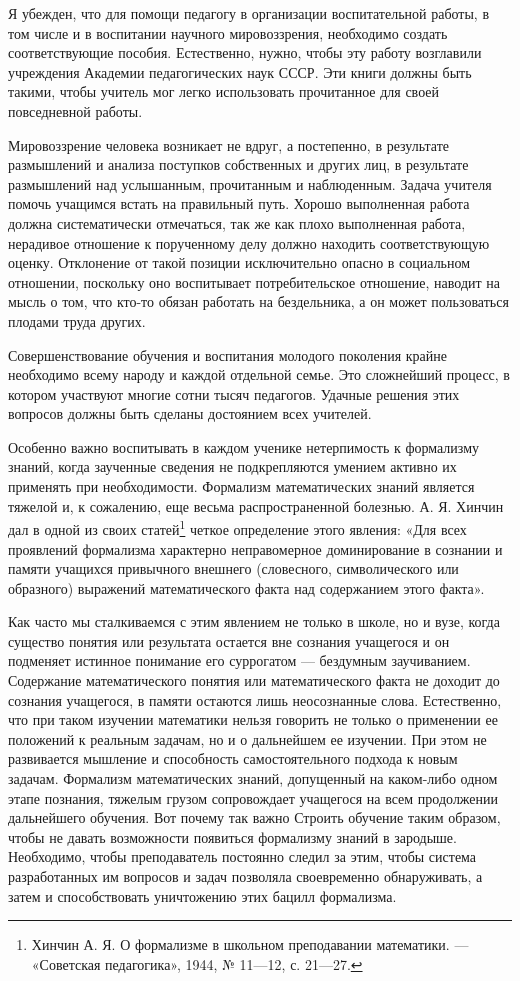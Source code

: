 \documentclass[12pt, a4paper, openany]{book}
\begin{document}
Я убежден, что для помощи педагогу в организации  воспитательной работы, в том числе и в воспитании научного мировоззрения, необходимо создать соответствующие  пособия. Естественно, нужно, чтобы эту работу возглавили учреждения Академии педагогических наук СССР. Эти  книги должны быть такими, чтобы учитель мог легко  использовать прочитанное для своей повседневной работы. 

Мировоззрение человека возникает не вдруг, а  постепенно, в результате размышлений и анализа поступков  собственных и других лиц, в результате размышлений над  услышанным, прочитанным и наблюденным. Задача учителя помочь учащимся встать на правильный путь. Хорошо выполненная работа должна систематически отмечаться, так же как плохо выполненная работа, нерадивое отношение к порученному делу должно находить соответствующую оценку. Отклонение от такой позиции исключительно  опасно в социальном отношении, поскольку оно воспитывает потребительское отношение, наводит на мысль о том, что кто-то обязан работать на бездельника, а он может  пользоваться плодами труда других. 

Совершенствование обучения и воспитания молодого поколения крайне необходимо всему народу и каждой  отдельной семье. Это сложнейший процесс, в котором  участвуют многие сотни тысяч педагогов. Удачные решения этих вопросов должны быть сделаны достоянием всех  учителей. 

Особенно важно воспитывать в каждом ученике  нетерпимость к формализму знаний, когда заученные сведения не подкрепляются умением активно их применять при  необходимости. Формализм математических знаний является тяжелой и, к сожалению, еще весьма распространенной болезнью. А. Я. Хинчин дал в одной из своих статей{\footnote{Хинчин А. Я. О формализме в школьном преподавании математики. — «Советская педагогика», 1944, № 11—12, с. 21—27.}} четкое определение этого явления: «Для всех проявлений формализма характерно неправомерное доминирование в сознании и памяти учащихся привычного внешнего (словесного, символического или образного) выражений  математического факта над содержанием этого факта». 

Как часто мы сталкиваемся с этим явлением не только в школе, но и вузе, когда существо понятия или результата остается вне сознания учащегося и он подменяет истинное понимание его суррогатом — бездумным заучиванием.  Содержание математического понятия или математического факта не доходит до сознания учащегося, в памяти остаются лишь неосознанные слова. Естественно, что при таком  изучении математики нельзя говорить не только о применении ее положений к реальным задачам, но и о дальнейшем ее изучении. При этом не развивается мышление и  способность самостоятельного подхода к новым задачам.  Формализм математических знаний, допущенный на каком-либо одном этапе познания, тяжелым грузом сопровождает учащегося на всем продолжении дальнейшего обучения. Вот почему так важно Строить обучение таким образом, чтобы не давать возможности появиться формализму  знаний в зародыше. Необходимо, чтобы преподаватель  постоянно следил за этим, чтобы система разработанных им  вопросов и задач позволяла своевременно обнаруживать, а затем и способствовать уничтожению этих бацилл формализма. 
\end{document}
